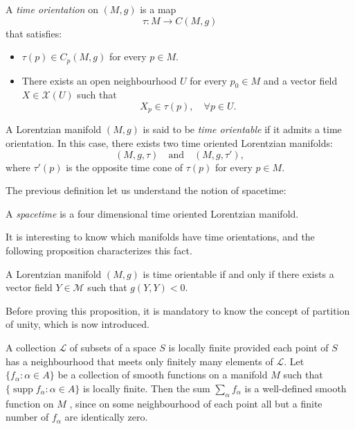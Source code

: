 \begin{definition}
	A \emph{time orientation} on $(M,g)$ is a map
	\[
		\tau \colon M \to C(M,g)
	\]
	that satisfies:
	\begin{itemize}
		\item $\tau(p) \in C_p(M,g)$ for every $p \in M$.
		\item There exists an open neighbourhood $U$ for every $p_0 \in M$ and a vector field $X \in \mathcal{X}(U)$ such that
		\[
			X_p \in \tau(p), \quad \forall p \in U.
		\]
	\end{itemize}

	A Lorentzian manifold $(M,g)$ is said to be \emph{time orientable} if it admits a time orientation. In this case, there exists two time oriented Lorentzian manifolds:
	\[
		(M,g,\tau) \quad\textrm{and}\quad (M,g,\tau'),
	\]
	where $\tau'(p)$ is the opposite time cone of $\tau(p)$ for every $p\in M$.
\end{definition}

The previous definition let us understand the notion of spacetime:

\begin{definition}[Spacetime]
	A \emph{spacetime} is a four dimensional time oriented Lorentzian manifold.
\end{definition}

It is interesting to know which manifolds have time orientations, and the following proposition characterizes this fact.

\begin{proposition}
	\label{pro:timeorientable}
	A Lorentzian manifold $(M,g)$ is time orientable if and only if there exists a vector field $Y \in \mathcal{M}$ such that $g(Y,Y) < 0$.
\end{proposition}

Before proving this proposition, it is mandatory to know the concept of partition of unity, which is now introduced.

A collection $\mathcal{L}$ of subsets of a space $S$ is locally finite provided each point of $S$ has a neighbourhood that meets only finitely many elements of $\mathcal{L}$. Let $\{f_\alpha \colon \alpha \in A\}$ be a collection of smooth functions on a manifold $M$ such that $\{\operatorname{supp} f_\alpha \colon \alpha \in A\}$ is locally finite. Then the sum $\sum_\alpha f_\alpha$ is a well-defined smooth function on $M$ , since on some neighbourhood of each point all but a finite number of $f_\alpha$ are identically zero.

